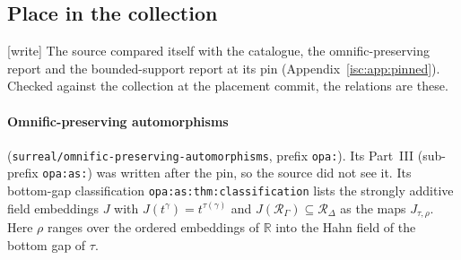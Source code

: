 \documentclass[11pt,letterpaper]{article}
\theoremstyle{definition}
\theoremstyle{remark}
\newcommand{\R}{\mathbb R}
\newcommand{\rpath}[1]{\nolinkurl{#1}}%
\newcommand{\lbl}[1]{\nolinkurl{#1}}%
\newcommand{\wtag}{\textup{[write]}}%
\numberwithin{equation}{section}
\begin{document}
\subsection{Place in the collection}\label{isc:sec:collection}

\wtag{} The source compared itself with the catalogue, the
omnific-preserving report and the bounded-support report at its pin
(Appendix~\ref{isc:app:pinned}). Checked against the collection at the
placement commit, the relations are these.

\paragraph{Omnific-preserving automorphisms}
(\rpath{surreal/omnific-preserving-automorphisms}, prefix \texttt{opa:}).
Its Part~III (sub-prefix \texttt{opa:as:}) was written after the pin, so the
source did not see it. Its bottom-gap classification
\lbl{opa:as:thm:classification} lists the strongly additive field embeddings
$J$ with $J(t^\gamma)=t^{\tau(\gamma)}$ and $J(\mathcal R_\Gamma)\subseteq
\mathcal R_\Delta$ as the maps $J_{\tau,\rho}$. Here $\rho$ ranges over
the ordered embeddings of $\R$ into the Hahn field of the bottom gap of
$\tau$.
\end{document}
